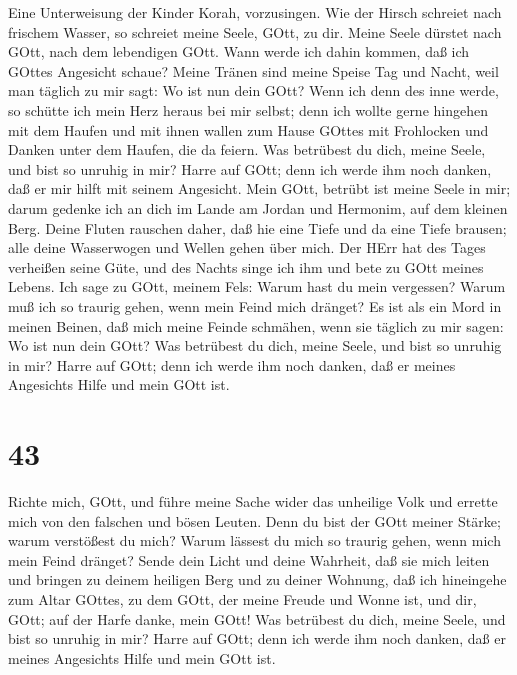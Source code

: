  Eine Unterweisung der Kinder Korah, vorzusingen.
 Wie der Hirsch schreiet nach frischem Wasser, so schreiet
meine Seele, GOtt, zu dir.  Meine Seele dürstet nach GOtt,
nach dem lebendigen GOtt. Wann werde ich dahin kommen, daß ich GOttes
Angesicht schaue?  Meine Tränen sind meine Speise Tag und
Nacht, weil man täglich zu mir sagt: Wo ist nun dein GOtt? 
Wenn ich denn des inne werde, so schütte ich mein Herz heraus bei mir
selbst; denn ich wollte gerne hingehen mit dem Haufen und mit ihnen
wallen zum Hause GOttes mit Frohlocken und Danken unter dem Haufen, die
da feiern.  Was betrübest du dich, meine Seele, und bist so
unruhig in mir? Harre auf GOtt; denn ich werde ihm noch danken, daß er
mir hilft mit seinem Angesicht.  Mein GOtt, betrübt ist
meine Seele in mir; darum gedenke ich an dich im Lande am Jordan und
Hermonim, auf dem kleinen Berg.  Deine Fluten rauschen
daher, daß hie eine Tiefe und da eine Tiefe brausen; alle deine
Wasserwogen und Wellen gehen über mich.  Der HErr hat des
Tages verheißen seine Güte, und des Nachts singe ich ihm und bete zu
GOtt meines Lebens.  Ich sage zu GOtt, meinem Fels: Warum
hast du mein vergessen? Warum muß ich so traurig gehen, wenn mein Feind
mich dränget?  Es ist als ein Mord in meinen Beinen, daß
mich meine Feinde schmähen, wenn sie täglich zu mir sagen: Wo ist nun
dein GOtt?  Was betrübest du dich, meine Seele, und bist so
unruhig in mir? Harre auf GOtt; denn ich werde ihm noch danken, daß er
meines Angesichts Hilfe und mein GOtt ist.

\hypertarget{section-42}{%
\section{43}\label{section-42}}

 Richte mich, GOtt, und führe meine Sache wider das
unheilige Volk und errette mich von den falschen und bösen Leuten.
 Denn du bist der GOtt meiner Stärke; warum verstößest du
mich? Warum lässest du mich so traurig gehen, wenn mich mein Feind
dränget?  Sende dein Licht und deine Wahrheit, daß sie mich
leiten und bringen zu deinem heiligen Berg und zu deiner Wohnung,
 daß ich hineingehe zum Altar GOttes, zu dem GOtt, der meine
Freude und Wonne ist, und dir, GOtt; auf der Harfe danke, mein GOtt!
 Was betrübest du dich, meine Seele, und bist so unruhig in
mir? Harre auf GOtt; denn ich werde ihm noch danken, daß er meines
Angesichts Hilfe und mein GOtt ist.

